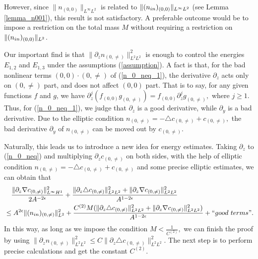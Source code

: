 \documentclass[12pt, reqno]{amsart}
\numberwithin{equation}{section}
\begin{document}
	However, since $\|n_{(0,0)}\|_{L^{\infty}L^2}$ is related to $\|(n_{\rm in})_{(0,0)}\|_{L^{\infty}L^2}$ (see Lemma \ref{lemma_n001}), this result is not satisfactory. 
	A preferable outcome would be to impose a restriction on the total mass $M$ without requiring a restriction on $\|(n_{\rm in})_{(0,0)}\|_{L^2}$.
	
	Our important find is that $\|\partial_zn_{(0,\neq)}\|^2_{L^2L^2}$ is enough
	to control the energies $E_{1,2}$ and $E_{1,3}$ under the assumptions
	(\ref{assumption}).
	A fact is that, for the bad nonlinear terms $(0,0)\cdot(0,\neq)$ of (\ref{n_0_neq_1}), the derivative 
	$\partial_z$ acts only on $(0,\neq)$ part, and does not affect  $(0,0)$ part. 
	That is to say, for any given functions $f$ and $g$, we have 
	$\partial_z^j(f_{(0,0)}g_{(0,\neq)})=f_{(0,0)}\partial_z^jg_{(0,\neq)},$
	where $j\geq 1.$ 
	Thus, for (\ref{n_0_neq_1}), we judge that $\partial_z$ is a good derivative, while $\partial_y$ is a bad derivative.  
	Due to the elliptic condition $n_{(0,\neq)}=-\triangle c_{(0,\neq)}+c_{(0,\neq)},$ the bad derivative $\partial_y$ of $n_{(0,\neq)}$ can 
	be moved out by  $c_{(0,\neq)}.$
	
	Naturally, this leads us to introduce a new idea for energy estimates. 
	Taking $\partial_z$ to (\ref{n_0_neq}) and multiplying  $\partial_zc_{(0,\neq)}$ on both sides, 
	with the help of elliptic condition $n_{(0,\neq)}=-\triangle c_{(0,\neq)}+c_{(0,\neq)}$ and some precise elliptic estimates,
	we can obtain that 
	\begin{equation*}
		\begin{aligned}
			&\quad\frac{\|\partial_z\nabla c_{(0,\neq)}\|^2_{L^{\infty}H^1}
			}{2A^{-2\epsilon}}
			+\frac{\|\partial_z\triangle c_{(0,\neq)}\|^2_{L^2L^2}+
				\|\partial_z\nabla c_{(0,\neq)}\|^2_{L^{2}L^2}}{A^{1-2\epsilon}}\\
			&\leq A^{2\epsilon}\|(n_{\rm in})_{(0,\neq)}\|^2_{L^2}
			+\frac{C^{(2)}M(\|\partial_z\triangle c_{(0,\neq)}\|^2_{L^2L^2}+
				\|\partial_z\nabla c_{(0,\neq)}\|^2_{L^{2}L^2})}{A^{1-2\epsilon}}
			+``{\rm good~terms}".
		\end{aligned}
	\end{equation*}
	In this way, as long as we impose the condition $M<\frac{1}{C^{(2)}},$ 
	we can finish the proof by using $\|\partial_zn_{(0,\neq)}\|^2_{L^2L^2}\leq C\|\partial_z\triangle c_{(0,\neq)}\|^2_{L^2L^2}$.
	The next step is to perform precise calculations and get the constant $C^{(2)}.$
	
\end{document}
